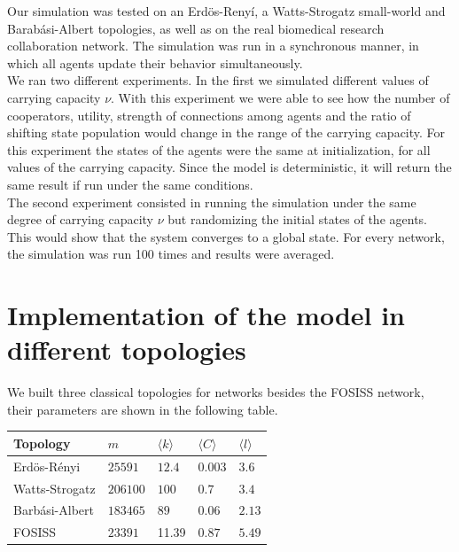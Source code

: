 \documentclass[11pt]{article}
\begin{document}
Our simulation was tested on an Erd\"{o}s-Reny\'i, a
Watts-Strogatz small-world and Barab\'asi-Albert topologies, as well
as on the real biomedical research collaboration network. The
simulation was run in a synchronous manner, in which all agents update their
behavior simultaneously. \\   

We ran two different experiments. In the first we simulated different values of
carrying capacity $\nu$. With this experiment we were able to see how the number of
cooperators, utility, strength of connections among agents and the ratio of
shifting state population would change in the range of the carrying
capacity. For this experiment the states of the agents were the same at
initialization, for all values of the carrying capacity. Since the model is
deterministic, it will return the same result if run under the same
conditions.\\ 

The second experiment consisted in running the simulation under the same degree of carrying capacity $\nu$ but randomizing the initial states of the agents. This would show that the system converges to a global state. For every network, the simulation was run 100 times and results were averaged.

\section{Implementation of the model in different topologies}

We built three classical topologies for networks besides the FOSISS network, their parameters are shown in the following table.\\


\begin{tabular}{| l |  l | l |l|l|}
\hline
\bf{Topology}       & $m$              & $\langle k \rangle$          & $\langle C \rangle$      & $\langle l \rangle$ \\ \hline
Erd\"{o}s-R\'enyi  &  $25591$      &  $12.4$        &  $0.003$ & $3.6$  \\ \hline
Watts-Strogatz    &  $206100$   &  $100$         &  $0.7$      & $3.4$  \\ \hline
Barb\'asi-Albert    &  $183465$   &  $89$           &  $0.06$    & $2.13$ \\ \hline
FOSISS                    &  $23391$     &   11.39     &  $0.87$    &  $5.49$ \\ \hline
\end{tabular}\\ 
\end{document}
